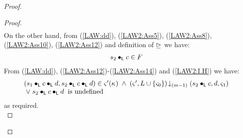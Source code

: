 \begin{lemma}[]
\begin{proof}
\begin{proof}
\begin{align}
\end{align}
%
On the other hand, from (\ref{LAW:dd}), (\ref{LAW2:Ass5}), (\ref{LAW2:Ass8}), (\ref{LAW2:Ass10}), (\ref{LAW2:Ass12}) and definition of $\unrhd$ we have:
%
\begin{align}
	s_2 \bullet_{\textsf{L}} c \in F \label{LAW2:Ass14}
\end{align}
%
From (\ref{LAW:dd}), (\ref{LAW2:Ass12})-(\ref{LAW2:Ass14}) and (\ref{LAW2:I.H}) we have:
%
%
\begin{align}
\begin{array}{l}
	(s_1 \bullet_{\textsf{L}} c \bullet_{\textsf{L}} d, s_2 \bullet_{\textsf{L}} c \bullet_{\textsf{L}} d) \in \varsigma_{}'(\kappa_{}) \;\land\; \left(\varsigma_{}', L \cup \{\varsigma_{0}\}\right) \!\downarrow_{(m-1)} \left(s_2 \bullet_{\textsf{L}} c, d, \varsigma_{1}\right)\\
	\;\lor\; s_2 \bullet_{\textsf{L}} c \bullet_{\textsf{L}} d \hspace*{0.2cm} \text{is undefined}
\end{array} \nonumber
\end{align}
%
as required.\\


\end{proof}
\end{proof}
\end{lemma}
